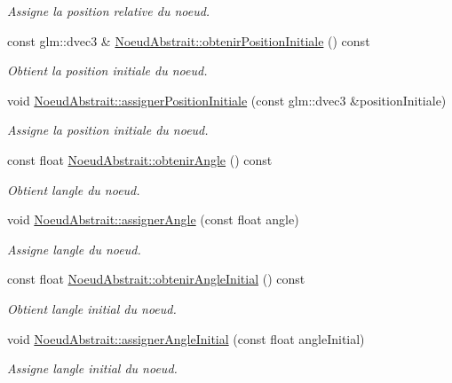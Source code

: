 \begin{DoxyCompactItemize}
\begin{DoxyCompactList}\small\item\em Assigne la position relative du noeud. \end{DoxyCompactList}\item 
const glm\+::dvec3 \& \hyperlink{group__inf2990_ga5e57e4e6ac1df01d25098fbeb7fcc56d}{Noeud\+Abstrait\+::obtenir\+Position\+Initiale} () const 
\begin{DoxyCompactList}\small\item\em Obtient la position initiale du noeud. \end{DoxyCompactList}\item 
void \hyperlink{group__inf2990_ga18ba04a32eaa8942418950a647e5e717}{Noeud\+Abstrait\+::assigner\+Position\+Initiale} (const glm\+::dvec3 \&position\+Initiale)
\begin{DoxyCompactList}\small\item\em Assigne la position initiale du noeud. \end{DoxyCompactList}\item 
const float \hyperlink{group__inf2990_ga9f5f0864e56b552efe95e693c198a3b4}{Noeud\+Abstrait\+::obtenir\+Angle} () const 
\begin{DoxyCompactList}\small\item\em Obtient l\textquotesingle{}angle du noeud. \end{DoxyCompactList}\item 
void \hyperlink{group__inf2990_ga7977957d758ca590a057aa33d76e5e75}{Noeud\+Abstrait\+::assigner\+Angle} (const float angle)
\begin{DoxyCompactList}\small\item\em Assigne l\textquotesingle{}angle du noeud. \end{DoxyCompactList}\item 
const float \hyperlink{group__inf2990_ga61797fb6a426150891203ea91e3f2cb8}{Noeud\+Abstrait\+::obtenir\+Angle\+Initial} () const 
\begin{DoxyCompactList}\small\item\em Obtient l\textquotesingle{}angle initial du noeud. \end{DoxyCompactList}\item 
void \hyperlink{group__inf2990_gaf0e7fd3676087b70949012a945000509}{Noeud\+Abstrait\+::assigner\+Angle\+Initial} (const float angle\+Initial)
\begin{DoxyCompactList}\small\item\em Assigne l\textquotesingle{}angle initial du noeud. \end{DoxyCompactList}\item 

\end{DoxyCompactItemize}
